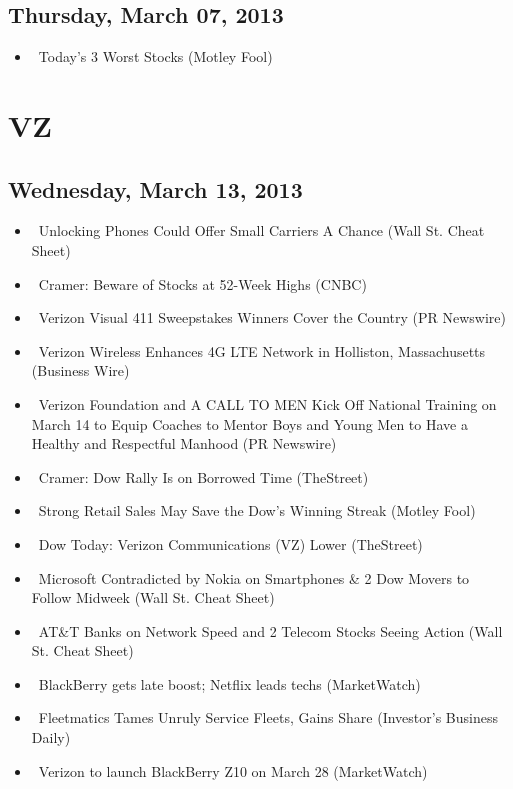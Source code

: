 \documentclass[11pt,asymmetric]{article}
\begin{document}
\subsection*{Thursday, March 07, 2013}
\begin{itemize}
\item\ Today's 3 Worst Stocks (Motley Fool)
\end{itemize}

\section*{VZ}

\subsection*{Wednesday, March 13, 2013}
\begin{itemize}
\item\ Unlocking Phones Could Offer Small Carriers A Chance (Wall St. Cheat Sheet)
\item\ Cramer: Beware of Stocks at 52-Week Highs (CNBC)
\item\ Verizon Visual 411 Sweepstakes Winners Cover the Country (PR Newswire)
\item\ Verizon Wireless Enhances 4G LTE Network in Holliston, Massachusetts (Business Wire)
\item\ Verizon Foundation and A CALL TO MEN Kick Off National Training on March 14 to Equip Coaches to Mentor Boys and Young Men to Have a Healthy and Respectful Manhood (PR Newswire)
\item\ Cramer: Dow Rally Is on Borrowed Time (TheStreet)
\item\ Strong Retail Sales May Save the Dow's Winning Streak (Motley Fool)
\item\ Dow Today: Verizon Communications (VZ) Lower (TheStreet)
\item\ Microsoft Contradicted by Nokia on Smartphones \& 2 Dow Movers to Follow Midweek (Wall St. Cheat Sheet)
\item\ AT\&T Banks on Network Speed and 2 Telecom Stocks Seeing Action (Wall St. Cheat Sheet)
\item\ BlackBerry gets late boost; Netflix leads techs (MarketWatch)
\item\ Fleetmatics Tames Unruly Service Fleets, Gains Share (Investor's Business Daily)
\item\ Verizon to launch BlackBerry Z10 on March 28 (MarketWatch)
\end{itemize}
\end{document}
